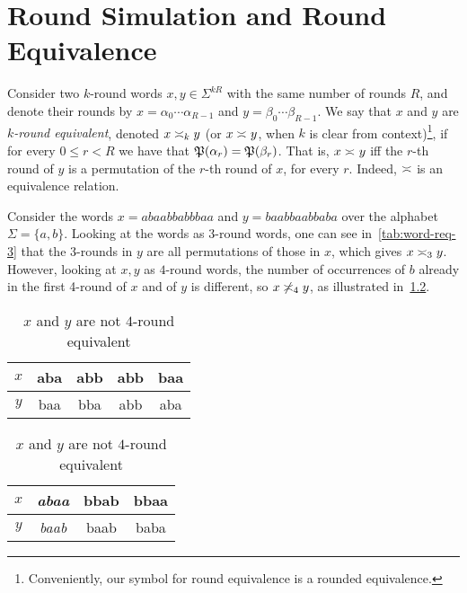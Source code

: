 \chapter{Round Simulation and Round Equivalence}
\label{chap:round_equivalence}

Consider two $k$-round words $x,y\in \Sigma^{kR}$ with the same number of rounds $R$, and denote their rounds by $x=\alpha_0\cdots \alpha_{R-1}$ and $y=\beta_0\cdots \beta_{R-1}$. We say that $x$ and $y$ are \emph{$k$-round equivalent}, denoted $x\req[k] y$ (or $x\req y$, when $k$ is clear from context)\footnote{Conveniently, our symbol for round equivalence is a rounded equivalence.}, if for every $0\le r<R$ we have that $\fP(\alpha_r)=\fP(\beta_r)$. That is, $x\req y$ iff the $r$-th round of $y$ is a permutation of the $r$-th round of $x$, for every $r$. Indeed, $\req$ is an equivalence relation.

\begin{example}
\label{example:word-req}
Consider the words $x=abaabbabbbaa$ and $y=baabbaabbaba$ over the alphabet $\Sigma=\{a,b\}$. Looking at the words as $3$-round words, one can see in~\cref{tab:word-req-3} that the 3-rounds in $y$ are all permutations of those in $x$, which gives $x\req[3] y$. However, looking at $x,y$ as $4$-round words, the number of occurrences of $b$ already in the first 4-round of $x$ and of $y$ is different, so $x\not\req[4] y$, as illustrated in~\cref{tab:word-req-4}.
\begin{table}[!htb]
\begin{minipage}{.5\linewidth}
    \centering
    \caption{$x$ and $y$ are $3$-round equivalent}
    \vspace{2mm}
    \begin{tabular}{c||c|c|c|c}
        $x$ & aba & abb & abb & baa \\
        \hline
        $y$ & baa & bba & abb & aba \\
    \end{tabular}
    \label{tab:word-req-3}
\end{minipage}%
\begin{minipage}{.5\linewidth}
    \centering
    \caption{$x$ and $y$ are not $4$-round equivalent}
    \vspace{2mm}
    \begin{tabular}{c||c|c|c}
        $x$ & \emph{abaa} & bbab & bbaa \\
        \hline
        $y$ & \emph{baab} & baab & baba \\
    \end{tabular}
    \label{tab:word-req-4}
\end{minipage}
\end{table}
\end{example}

